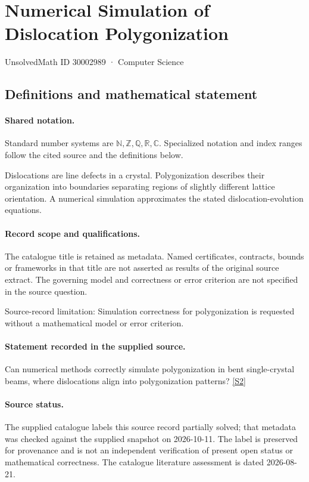 \documentclass[11pt]{article}
\newcommand{\sref}[2]{\hyperlink{source:#1:#2}{[S#2]}}
\begin{document}
\setcounter{section}{30002988}
\section{Numerical Simulation of Dislocation Polygonization}\label{30002989}
{\small\sffamily UnsolvedMath ID 30002989 · Computer Science}
\subsection{Definitions and mathematical statement}

\paragraph{Shared notation.}Standard number systems are $\mathbb N,\mathbb Z,\mathbb Q,\mathbb R,\mathbb C$. Specialized notation and index ranges follow the cited source and the definitions below.


Dislocations are line defects in a crystal. Polygonization describes their organization into boundaries separating regions of slightly different lattice orientation. A numerical simulation approximates the stated dislocation-evolution equations.
\paragraph{Record scope and qualifications.}
The catalogue title is retained as metadata. Named certificates, contracts, bounds or frameworks in that title are not asserted as results of the original source extract.
The governing model and correctness or error criterion are not specified in the source question.

Source-record limitation: Simulation correctness for polygonization is requested without a mathematical model or error criterion.
\paragraph{Statement recorded in the supplied source.}
Can numerical methods correctly simulate polygonization in bent single-crystal beams, where dislocations align into polygonization patterns? \sref{30002989}{2}
\paragraph{Source status.}
The supplied catalogue labels this source record partially solved; that metadata was checked against the supplied snapshot on 2026-10-11. The label is preserved for provenance and is not an independent verification of present open status or mathematical correctness. The catalogue literature assessment is dated 2026-08-21.
\end{document}
